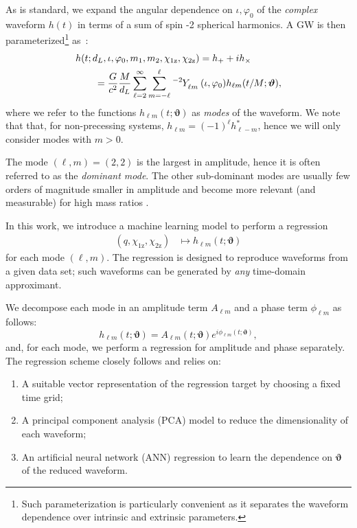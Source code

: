 \documentclass[twocolumn,showpacs,preprintnumbers,nofootinbib,prd,
superscriptaddress,10pt]{revtex4-1}
\begin{document}
As is standard, we expand the angular dependence on $\iota, \varphi_0$ of the {\it complex} waveform $h(t)$ 
in terms of a sum of spin -2 spherical harmonics.
A GW is then parameterized\footnote{Such parameterization is particularly convenient as it separates 
the waveform dependence over intrinsic and extrinsic parameters.} as~\cite{Estelles:2021gvs}:
\begin{align} \label{eq:h_parametrization}
	&h(t; d_L,\iota,\varphi_0, m_1, m_2, \chi_\text{1z}, \chi_\text{2z}) = h_+ + i h_\times \nonumber \\
		&\qquad= \frac{G}{c^2} \frac{M}{d_L}\sum_{\ell = 2}^{\infty} \sum_{m = -\ell}^{\ell} \tensor[^{-2}]{Y}{_{\ell m}}(\iota, \varphi_0) h_{\ell m}(t/M; \boldsymbol{\vartheta}),
\end{align}
where we refer to the functions $h_{\ell m}(t; \boldsymbol{\vartheta})$ as {\it modes} of the waveform. We note that that, 
for non-precessing systems, $h_{\ell m} = (-1)^\ell h^*_{\ell -m}$, hence we will only consider modes with $m>0$.

The mode $(\ell, m) = (2,2)$ is the largest in amplitude, hence it is often referred to as the {\it dominant mode}. 
The other sub-dominant modes are usually few orders of magnitude smaller in amplitude and become more relevant 
(and measurable) for high mass ratios \cite{Mills:2020thr, LIGOScientific:2020stg, LIGOScientific:2020zkf}.

In this work, we introduce a machine learning model to perform a regression
\begin{align}\label{eq:objective}
	(q, \chi_\text{1z}, \chi_\text{2z}) &\longmapsto h_{\ell m}(t; \boldsymbol{\vartheta})
\end{align}
for each mode $(\ell,m)$.
The regression is designed to reproduce waveforms from a given data set; such waveforms can be generated 
by {\it any} time-domain approximant.

We decompose each mode in an amplitude term $A_{\ell m}$ and a phase term $\phi_{\ell m}$ as follows:
\begin{equation}
	h_{\ell m}(t; \boldsymbol{\vartheta}) = A_{\ell m}(t; \boldsymbol{\vartheta}) e^{i \phi_{\ell m}(t; \boldsymbol{\vartheta})},
\end{equation}
and, for each mode, we perform a regression for amplitude and phase separately. The regression scheme closely follows \cite{Schmidt:2020yuu} and relies on:
\begin{enumerate}[label=(\alph*)]
	\item A suitable vector representation of the regression target by choosing a fixed time grid;
	\item A principal component analysis (PCA) model to reduce the dimensionality of each waveform;
	\item An artificial neural network (ANN) regression to learn the dependence on $\boldsymbol{\vartheta}$ of the 
	reduced waveform.
\end{enumerate}
\end{document}
